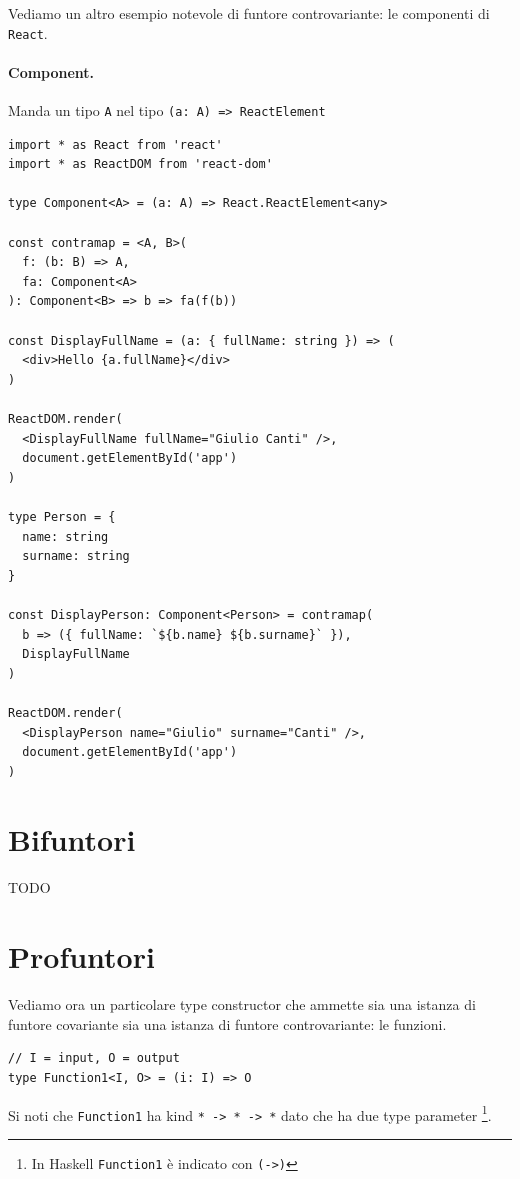 \documentclass[12pt]{article}
\begin{document}
Vediamo un altro esempio notevole di funtore controvariante: le componenti di \texttt{React}.

\paragraph{Component.}

Manda un tipo \texttt{A} nel tipo \texttt{(a: A) => ReactElement}

\begin{verbatim}
import * as React from 'react'
import * as ReactDOM from 'react-dom'

type Component<A> = (a: A) => React.ReactElement<any>

const contramap = <A, B>(
  f: (b: B) => A,
  fa: Component<A>
): Component<B> => b => fa(f(b))

const DisplayFullName = (a: { fullName: string }) => (
  <div>Hello {a.fullName}</div>
)

ReactDOM.render(
  <DisplayFullName fullName="Giulio Canti" />,
  document.getElementById('app')
)

type Person = {
  name: string
  surname: string
}

const DisplayPerson: Component<Person> = contramap(
  b => ({ fullName: `${b.name} ${b.surname}` }),
  DisplayFullName
)

ReactDOM.render(
  <DisplayPerson name="Giulio" surname="Canti" />,
  document.getElementById('app')
)
\end{verbatim}

\newpage

\section{Bifuntori}

TODO

\newpage

\section{Profuntori}

Vediamo ora un particolare type constructor che ammette sia una istanza di funtore covariante sia una istanza di
funtore controvariante: le funzioni.

\begin{verbatim}
// I = input, O = output
type Function1<I, O> = (i: I) => O
\end{verbatim}

Si noti che \texttt{Function1} ha kind \texttt{* -> * -> *} dato che
ha due type parameter \footnote{In Haskell \texttt{Function1} è indicato con \texttt{(->)}}.
\end{document}
